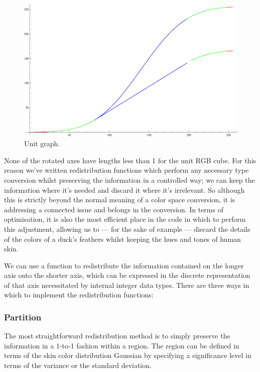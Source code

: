 \documentclass[10pt,a4paper]{article}
\begin{document}
\begin{figure}[h!]
  \caption{Unit graph.}
  \label{fig:UnitGraph}
  \centering
    \includegraphics[width=\textwidth]{unitGraph.eps}
\end{figure}


None of the rotated axes have lengths less than 1 for the unit RGB cube. For this reason we've written redistribution functions which perform any necessary type conversion whilst preserving the information in a controlled way; we can keep the information where it's needed and discard it where it's irrelevant. So although this is strictly beyond the normal meaning of a color space conversion, it is addressing a connected issue and belongs in the conversion. In terms of optimisation, it is also the most efficient place in the code in which to perform this adjustment, allowing us to --- for the sake of example --- discard the details of the colors of a duck's feathers whilst keeping the hues and tones of human skin.

We can use a function to redistribute the information contained on the longer axis onto the shorter axis, which can be expressed in the discrete representation of that axis necessitated by internal integer data types. There are three ways in which to implement the redistribution functions:

\subsubsection{Partition}\label{sec:Partition}
The most straightforward redistribution method is to simply preserve the information in a 1-to-1 fashion within a region. The region can be defined in terms of the skin color distribution Gaussian by specifying a significance level in terms of the variance or the standard deviation.
\end{document}
